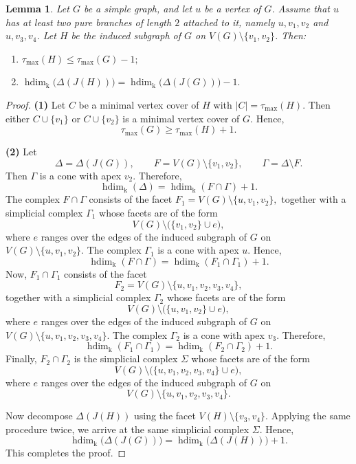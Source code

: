 \documentclass[12pt,amscd]{amsart}
\newtheorem{lem}[thm]{Lemma}
\theoremstyle{definition}
\DeclareMathOperator{\hdim}{hdim}
\def\k {\mathrm k}
\begin{document}
\begin{lem}\label{lem_reduction_4}
Let $G$ be a simple graph, and let $u$ be a vertex of $G$. Assume that $u$ has at least two pure branches of length $2$ attached to it, namely $u,v_1,v_2$ and $u,v_3,v_4$. Let $H$ be the induced subgraph of $G$ on $V(G) \setminus \{v_1,v_2\}$. Then:
\begin{enumerate}
    \item
    \(    \tau_{\max}(H) \le \tau_{\max}(G) - 1;
    \)

    \item
    \(
    \hdim_{\k}\bigl(\Delta(J(H))\bigr)
    =
    \hdim_{\k}\bigl(\Delta(J(G))\bigr) - 1.
    \)
\end{enumerate}
\end{lem}

\begin{proof}
\textbf{(1)} Let $C$ be a minimal vertex cover of $H$ with \( |C| = \tau_{\max}(H).\) Then either $C \cup \{v_1\}$ or $C \cup \{v_2\}$ is a minimal vertex cover of $G$. Hence,
\[
\tau_{\max}(G) \ge \tau_{\max}(H) + 1.
\]

\medskip

\textbf{(2)} Let
\[
\Delta = \Delta(J(G)),
\qquad
F = V(G) \setminus \{v_1,v_2\},
\qquad
\Gamma = \Delta \setminus F.
\]
Then $\Gamma$ is a cone with apex $v_2$. Therefore,
\[
\hdim_{\k}(\Delta)
=
\hdim_{\k}(F \cap \Gamma) + 1.
\]
The complex $F \cap \Gamma$ consists of the facet
\( F_1 = V(G) \setminus \{u,v_1,v_2\},
\) together with a simplicial complex $\Gamma_1$ whose facets are of the form
\[
V(G) \setminus \bigl(\{v_1,v_2\} \cup e\bigr),
\]
where $e$ ranges over the edges of the induced subgraph of $G$ on \(V(G) \setminus \{u,v_1,v_2\}.\)
The complex $\Gamma_1$ is a cone with apex $u$. Hence,
\[
\hdim_{\k}(F \cap \Gamma)
=
\hdim_{\k}(F_1 \cap \Gamma_1) + 1.
\]
Now, $F_1 \cap \Gamma_1$ consists of the facet
\[
F_2 = V(G) \setminus \{u,v_1,v_2,v_3,v_4\},
\]
together with a simplicial complex $\Gamma_2$ whose facets are of the form
\[
V(G) \setminus \bigl(\{u,v_1,v_2\} \cup e\bigr),
\]
where $e$ ranges over the edges of the induced subgraph of $G$ on \(V(G) \setminus \{u,v_1,v_2,v_3,v_4\}.\) The complex $\Gamma_2$ is a cone with apex $v_3$. Therefore,
\[
\hdim_{\k}(F_1 \cap \Gamma_1)
=
\hdim_{\k}(F_2 \cap \Gamma_2) + 1.
\]
Finally, $F_2 \cap \Gamma_2$ is the simplicial complex $\Sigma$ whose facets are of the form
\[
V(G) \setminus \bigl(\{u,v_1,v_2,v_3,v_4\} \cup e\bigr),
\]
where $e$ ranges over the edges of the induced subgraph of $G$ on
\[
V(G) \setminus \{u,v_1,v_2,v_3,v_4\}.
\]

Now decompose $\Delta(J(H))$ using the facet \(V(H) \setminus \{v_3,v_4\}.\) Applying the same procedure twice, we arrive at the same simplicial complex $\Sigma$. Hence,
\[
\hdim_{\k}\bigl(\Delta(J(G))\bigr)
=
\hdim_{\k}\bigl(\Delta(J(H))\bigr) + 1.
\]
This completes the proof.
\end{proof}
\end{document}
